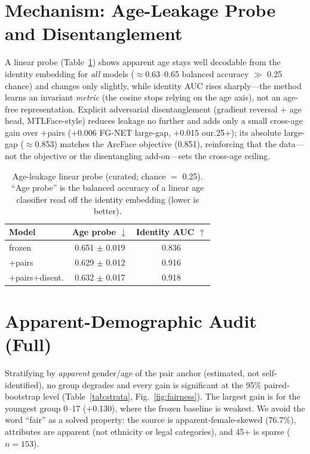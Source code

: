\documentclass[letterpaper]{article} %
\begin{document}
\section{Mechanism: Age-Leakage Probe and Disentanglement}\label{sup:leakage}
A linear probe (Table~\ref{tab:leakage}) shows apparent age stays well decodable from the identity embedding for \emph{all} models ($\approx$0.63--0.65 balanced accuracy $\gg$ 0.25 chance) and changes only slightly, while identity AUC rises sharply---the method learns an invariant \emph{metric} (the cosine stops relying on the age axis), not an age-free representation. Explicit adversarial disentanglement (gradient reversal $+$ age head, MTLFace-style) reduces leakage no further and adds only a small cross-age gain over $+$pairs ($+$0.006 FG-NET large-gap, $+$0.015 our.25+); its absolute large-gap ($\approx$0.853) matches the ArcFace objective (0.851), reinforcing that the data---not the objective or the disentangling add-on---sets the cross-age ceiling.

\begin{table}[t]
\centering
\small
\setlength{\tabcolsep}{4pt}
\begin{tabular}{@{}lcc@{}}
\toprule
Model & Age probe $\downarrow$ & Identity AUC $\uparrow$ \\
\midrule
frozen & 0.651 $\pm$ 0.019 & 0.836 \\
$+$pairs & 0.629 $\pm$ 0.012 & 0.916 \\
$+$pairs$+$disent. & 0.632 $\pm$ 0.017 & 0.918 \\
\bottomrule
\end{tabular}
\caption{Age-leakage linear probe (curated; chance $=$ 0.25). ``Age probe'' is the balanced accuracy of a linear age classifier read off the identity embedding (lower is better).}
\label{tab:leakage}
\end{table}

\section{Apparent-Demographic Audit (Full)}\label{sup:fairness}
Stratifying by \emph{apparent} gender/age of the pair anchor (estimated, not self-identified), no group degrades and every gain is significant at the 95\% paired-bootstrap level (Table~\ref{tab:strata}, Fig.~\ref{fig:fairness}). The largest gain is for the youngest group 0--17 ($+$0.130), where the frozen baseline is weakest. We avoid the word ``fair'' as a solved property: the source is apparent-female-skewed (76.7\%), attributes are apparent (not ethnicity or legal categories), and 45+ is sparse ($n{=}153$).
\end{document}
